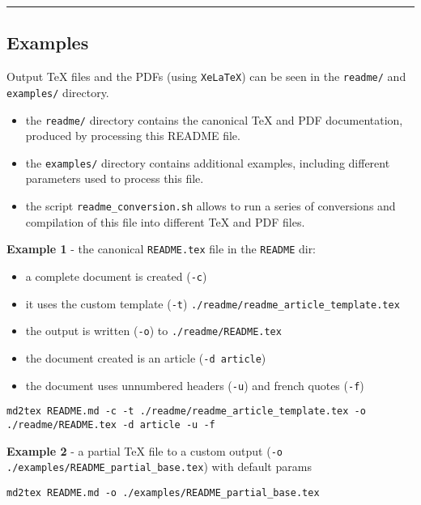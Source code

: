 \documentclass[a4paper, 12pt, twoside]{article}
\begin{document}
\par\noindent\rule{\linewidth}{0.4pt}
\subsection{Examples}

Output TeX files and the PDFs (using \texttt{XeLaTeX}) can be seen in the \texttt{readme/} and \texttt{examples/} directory.

\begin{itemize}
\item the \texttt{readme/} directory contains the canonical TeX and PDF documentation, produced by processing this README file.
\item the \texttt{examples/} directory contains additional examples, including different parameters used to process this file.
\item the script \texttt{readme\_conversion.sh} allows to run a series of conversions and compilation of this file into different TeX and PDF files. 
\end{itemize}

\textbf{Example 1} - the canonical \texttt{README.tex} file in the \texttt{README} dir:

\begin{itemize}
\item a complete document is created (\texttt{-c})
\item it uses the custom template (\texttt{-t}) \texttt{./readme/readme\_article\_template.tex}
\item the output is written (\texttt{-o}) to \texttt{./readme/README.tex}
\item the document created is an article (\texttt{-d article})
\item the document uses unnumbered headers (\texttt{-u}) and french quotes (\texttt{-f}) 
\end{itemize}

\begin{listing}[h!]
   \begin{verbatim}
md2tex README.md -c -t ./readme/readme_article_template.tex -o ./readme/README.tex -d article -u -f

   \end{verbatim}
\end{listing}

\textbf{Example 2} - a partial TeX file to a custom output (\texttt{-o ./examples/README\_partial\_base.tex}) with default params

\begin{listing}[h!]
   \begin{verbatim}
md2tex README.md -o ./examples/README_partial_base.tex

   \end{verbatim}
\end{listing}
\end{document}
